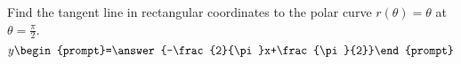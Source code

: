 \documentclass{ximera}
\author{Gregory Hartman \and Matthew Carr}
\begin{document}
\begin{exercise}






Find the tangent line in rectangular coordinates to the polar curve $r(\theta)=\theta$ at $\theta=\frac{\pi}{2}$. 
 \[
y\begin{prompt}=\answer{-\frac{2}{\pi}x+\frac{\pi}{2}}\end{prompt}
 \]      
 
\end{exercise}
\end{document}
